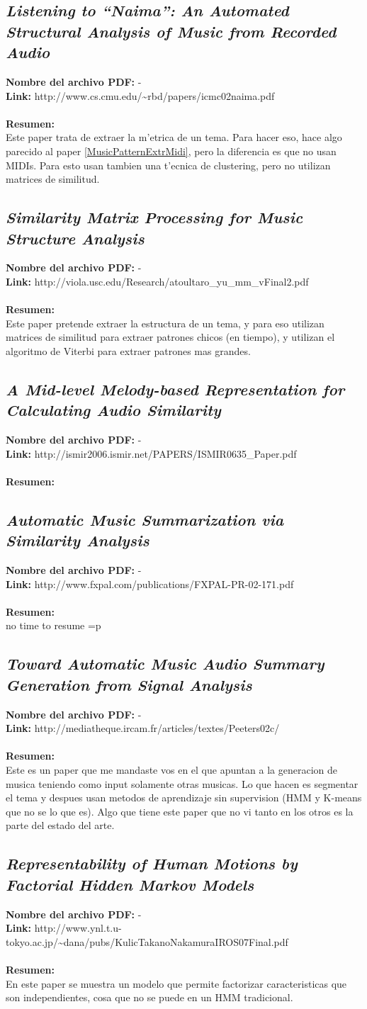 \documentclass[a4paper,10pt]{article}
\newcommand{\titulo}[1]{\def\Titulo{#1}}
\newcommand{\resumen}[1]{\def\Resumen{#1}}
\newcommand{\link}[1]{\def\Link{#1}}
\newenvironment{resumenpaper}{
\let\Titulo\empty
\let\Resumen\empty
\let\Archivo-
\let\Link-
\let\Id\empty
}{
\subsection{\textit{\Titulo}}
\label{\Id}
\noindent \textbf{Nombre del archivo PDF: }{\Archivo}\\
\noindent \textbf{Link: }{\Link}\\ \\
\noindent \textbf{Resumen:} \\ {\Resumen}
}
\begin{document}
\begin{resumenpaper}
 \titulo{Listening to ``Naima'': An Automated Structural Analysis of Music from Recorded Audio}
 \link{http://www.cs.cmu.edu/\~{}rbd/papers/icmc02naima.pdf}
 \resumen{Este paper trata de extraer la m'etrica de un tema. Para hacer eso, hace algo parecido al paper \ref{MusicPatternExtrMidi}, pero la diferencia es que no usan MIDIs. Para esto usan tambien una t'ecnica de clustering, pero no utilizan matrices de similitud.}
\end{resumenpaper}

\begin{resumenpaper}
 \titulo{Similarity Matrix Processing for Music Structure Analysis}
 \link{http://viola.usc.edu/Research/atoultaro\_yu\_mm\_vFinal2.pdf}
 \resumen{Este paper pretende extraer la estructura de un tema, y para eso utilizan matrices de similitud para extraer patrones chicos (en tiempo), y utilizan el algoritmo de Viterbi para extraer patrones mas grandes.}
\end{resumenpaper}

\begin{resumenpaper}
 \titulo{A Mid-level Melody-based Representation for Calculating Audio Similarity}
 \link{http://ismir2006.ismir.net/PAPERS/ISMIR0635\_Paper.pdf}
 \resumen{}
\end{resumenpaper}

\begin{resumenpaper}
 \titulo{Automatic Music Summarization via Similarity Analysis}
 \link{http://www.fxpal.com/publications/FXPAL-PR-02-171.pdf}
 \resumen{no time to resume =p}
\end{resumenpaper}


\begin{resumenpaper}
 \titulo{Toward Automatic Music Audio Summary Generation from Signal Analysis}
 \link{http://mediatheque.ircam.fr/articles/textes/Peeters02c/}
 \resumen{Este es un paper que me mandaste vos en el que apuntan a la generacion de musica teniendo como input solamente otras musicas. Lo que hacen es segmentar el tema y despues usan metodos de aprendizaje sin supervision (HMM y K-means que no se lo que es). Algo que tiene este paper que no vi tanto en los otros es la parte del estado del arte.}
\end{resumenpaper}

\begin{resumenpaper}
 \titulo{Representability of Human Motions by Factorial Hidden Markov Models }
 \link{http://www.ynl.t.u-tokyo.ac.jp/\~{}dana/pubs/KulicTakanoNakamuraIROS07Final.pdf}
 \resumen{En este paper se muestra un modelo que permite factorizar caracteristicas que son independientes, cosa que no se puede en un HMM tradicional. }
\end{resumenpaper}
\end{document}
